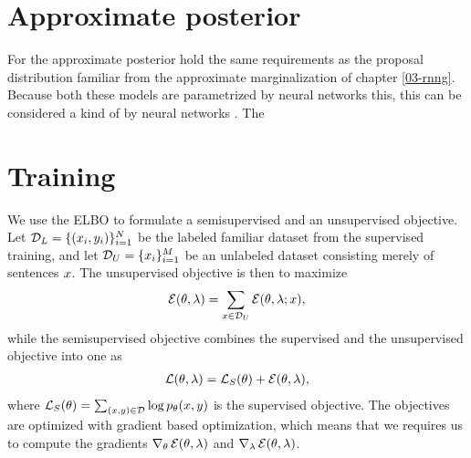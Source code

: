   \section{Approximate posterior}
    For the approximate posterior hold the same requirements as the proposal distribution familiar from the approximate marginalization of chapter \ref{03-rnng}.
    Because both these models are parametrized by neural networks this, this can be considered a kind of by neural networks \citep{kingma2014vae}. The


\section{Training}
  We use the ELBO to formulate a semisupervised and an unsupervised objective. Let $\mathcal{D}_L = \{ (x_i, y_i)\}_{i=1}^N$ be the labeled familiar dataset from the supervised training, and let $\mathcal{D}_U = \{ x_i \}_{i=1}^M$ be an unlabeled dataset consisting merely of sentences $x$. The unsupervised objective is then to maximize
  \begin{align}
    \operatorname{\mathcal{E}}(\theta, \lambda) = \sum_{ x \in \mathcal{D}_U } \operatorname{\mathcal{E}}(\theta, \lambda; x),
  \end{align}
  while the semisupervised objective combines the supervised and the unsupervised objective into one as
  \begin{align*}
    \operatorname{\mathcal{L}}(\theta, \lambda) = \operatorname{\mathcal{L}}_{S}(\theta) + \operatorname{\mathcal{E}}(\theta, \lambda),
  \end{align*}
  where $\operatorname{\mathcal{L}}_{S}(\theta) = \sum_{ (x, y) \in \mathcal{D} } \log p_{\theta}(x, y)$ is the supervised objective. The objectives are optimized with gradient based optimization, which means that we requires us to compute the gradients $\nabla_{\theta} \operatorname{\mathcal{E}}(\theta, \lambda)$ and $\nabla_{\lambda} \operatorname{\mathcal{E}}(\theta, \lambda)$.

